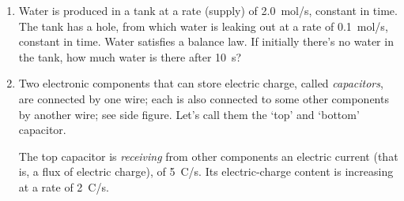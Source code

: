 \documentclass[a4paper,12pt,%
onecolumn,oneside,%
british%
]{memoir}
\renewcommand*{\|}[1][]{\nonscript\:#1\vert\nonscript\:\mathopen{}}
\begin{document}
\begin{enumerate}[exerc,itemsep=1em]
\item Water is produced in a tank at a rate (supply) of \qty{2.0}{mol/s}, constant in time. The tank has a hole, from which water is leaking out at a rate of \qty{0.1}{mol/s}, constant in time. Water satisfies a balance law. If initially there's no water in the tank, how much water is there after \qty{10}{s}?

\item {}%
Two electronic components that can store electric charge, called \emph{capacitors}, are connected by one wire; each is also connected to some other components by another wire; see side figure. Let's call them the \enquote*{top} and \enquote*{bottom} capacitor.

The top capacitor is \emph{receiving} from other components an electric current (that is, a flux of electric charge), of \qty{5}{C/s}. Its electric-charge content is increasing at a rate of \qty{2}{C/s}.


\end{enumerate}
\end{document}
